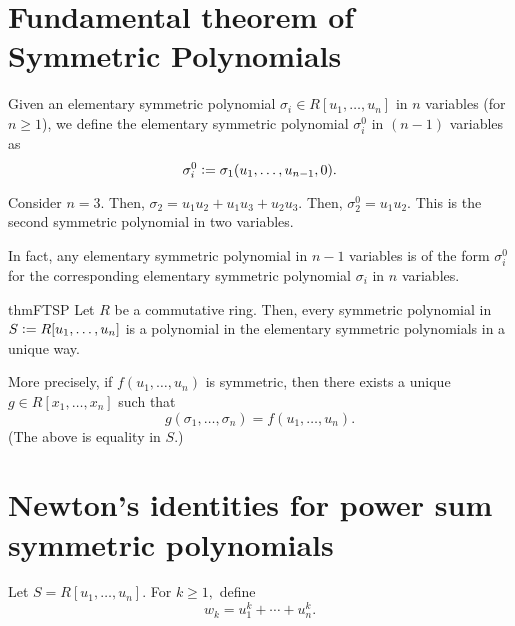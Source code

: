 \section{Fundamental theorem of Symmetric Polynomials}

\begin{defn}%
    Given an elementary symmetric polynomial $\sigma_i \in R[u_1, \ldots, u_n]$ in $n$ variables (for $n \ge 1$), we define the elementary symmetric polynomial $\sigma_i^0$ in $(n - 1)$ variables as
    \begin{equation*} 
        \sigma_i^0 \vcentcolon= \sigma_1(u_1, \ldots, u_{n - 1}, 0).
    \end{equation*}
\end{defn}

\begin{ex}
    Consider $n = 3.$ Then, $\sigma_2 = u_1u_2 + u_1u_3 + u_2u_3.$ Then, $\sigma_2^0 = u_1u_2.$ This is the second symmetric polynomial in two variables. 

    In fact, any elementary symmetric polynomial in $n - 1$ variables is of the form $\sigma_i^0$ for the corresponding elementary symmetric polynomial $\sigma_i$ in $n$ variables.
\end{ex}

\begin{restatable}{thm}{FTSP}
\label{thm:FTSP}
    Let $R$ be a commutative ring. Then, every symmetric polynomial in $S \vcentcolon= R[u_1, \ldots, u_n]$ is a polynomial in the elementary symmetric polynomials in a unique way.

    More precisely, if $f(u_1, \ldots, u_n)$ is symmetric, then there exists a unique $g \in R[x_1, \ldots, x_n]$ such that
    \begin{equation*} 
        g(\sigma_1, \ldots, \sigma_n) = f(u_1, \ldots, u_n).
    \end{equation*}
    (The above is equality in $S.$) \hfill\hyperref[thm:FTSP2]{\downsym}
\end{restatable}

\section{Newton's identities for power sum symmetric polynomials}

\begin{defn}%
    Let $S = R[u_1, \ldots, u_n].$ For $k \ge 1,$ define
    \begin{equation*} 
        w_k = u_1^k + \cdots + u_n^k.
    \end{equation*}
\end{defn}

